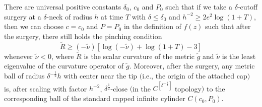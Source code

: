 \begin{lemma}
  \label{lem:cz-surgery-preserves-hamilton-ivey-pinching}
 There
are universal positive constants $\delta_0$, $c_0$ and $P_0$ such
that if we take a $\delta$-cutoff surgery at a $\delta$-neck of
radius $h$ at time $T$ with $\delta \leq \delta_0$ and $h^{-2}
\geq 2e^2\log(1+T)$, then we can choose $c=c_0$ and $P=P_0$ in the
definition of $f(z)$ such that after the surgery, there still
holds the pinching condition \begin{equation} \tilde{R} \geq
(-\tilde{\nu})[\log(-\tilde{\nu}) + \log(1+T) -3]
\end{equation} whenever $\tilde{\nu} < 0$, where $\tilde{R}$ is the scalar
curvature of the metric $\tilde{g}$ and $\tilde{\nu}$ is the least
eigenvalue of the curvature operator of $\tilde{g}$. Moreover,
after the surgery, any metric ball of radius
$\delta^{-\frac{1}{2}}h$ with center near the tip $($i.e., the
origin of the attached cap$)$ is, after scaling with factor
$h^{-2}$, $\delta^{\frac{1}{2}}$-close $($in the
$C^{[\delta^{-\frac{1}{2}}]}$ topology$)$ to the corresponding
ball of the standard capped infinite cylinder $C(c_0,P_0)$.
\end{lemma}

